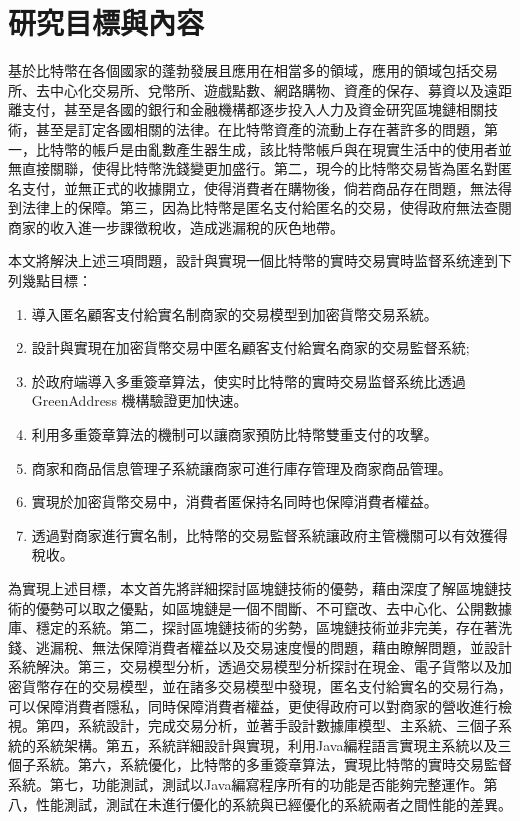 		

	\section{研究目標與內容}
	基於比特幣在各個國家的蓬勃發展且應用在相當多的領域，應用的領域包括交易所、去中心化交易所、兌幣所、遊戲點數、網路購物、資產的保存、募資以及遠距離支付，甚至是各國的銀行和金融機構都逐步投入人力及資金研究區塊鏈相關技術，甚至是訂定各國相關的法律。在比特幣資產的流動上存在著許多的問題，第一，比特幣的帳戶是由亂數產生器生成，該比特幣帳戶與在現實生活中的使用者並無直接關聯，使得比特幣洗錢變更加盛行。第二，現今的比特幣交易皆為匿名對匿名支付，並無正式的收據開立，使得消費者在購物後，倘若商品存在問題，無法得到法律上的保障。第三，因為比特幣是匿名支付給匿名的交易，使得政府無法查閱商家的收入進一步課徵稅收，造成逃漏稅的灰色地帶。

	本文將解決上述三項問題，設計與實現一個比特幣的實時交易實時监督系统達到下列幾點目標：

		\begin{enumerate}
			\item 導入匿名顧客支付給實名制商家的交易模型到加密貨幣交易系統。
			\item 設計與實現在加密貨幣交易中匿名顧客支付給實名商家的交易監督系統;
			\item 於政府端導入多重簽章算法，使实时比特幣的實時交易监督系统比透過 GreenAddress 機構驗證更加快速。
			\item 利用多重簽章算法的機制可以讓商家預防比特幣雙重支付的攻擊。
			\item 商家和商品信息管理⼦系統讓商家可進行庫存管理及商家商品管理。
			\item 實現於加密貨幣交易中，消費者匿保持名同時也保障消費者權益。
			\item 透過對商家進行實名制，比特幣的交易監督系統讓政府主管機關可以有效獲得稅收。
		\end{enumerate}

	為實現上述目標，本文首先將詳細探討區塊鏈技術的優勢，藉由深度了解區塊鏈技術的優勢可以取之優點，如區塊鏈是一個不間斷、不可竄改、去中心化、公開數據庫、穩定的系統。第二，探討區塊鏈技術的劣勢，區塊鏈技術並非完美，存在著洗錢、逃漏稅、無法保障消費者權益以及交易速度慢的問題，藉由瞭解問題，並設計系統解決。第三，交易模型分析，透過交易模型分析探討在現金、電子貨幣以及加密貨幣存在的交易模型，並在諸多交易模型中發現，匿名支付給實名的交易行為，可以保障消費者隱私，同時保障消費者權益，更使得政府可以對商家的營收進行檢視。第四，系統設計，完成交易分析，並著手設計數據庫模型、主系統、三個子系統的系統架構。第五，系統詳細設計與實現，利用Java編程語言實現主系統以及三個子系統。第六，系統優化，比特幣的多重簽章算法，實現比特幣的實時交易監督系統。第七，功能測試，測試以Java編寫程序所有的功能是否能夠完整運作。第八，性能測試，測試在未進行優化的系統與已經優化的系統兩者之間性能的差異。


